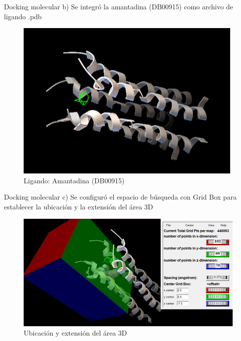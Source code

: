 \documentclass[11pt]{beamer}
\begin{document}
			\begin{frame}{Docking molecular}
			\justifying 
			b) Se integró la amantadina (DB00915) como archivo de ligando .pdb
			
			\begin{figure}[H]
				\centering
				\includegraphics[scale=0.5]{Eyligando.png}
				\caption{Ligando: Amantadina (DB00915)}
				\label{fig: Figura1}
			\end{figure}
		\end{frame} 
			
			
				\begin{frame}{Docking molecular}
			\justifying 
			c) Se configuró el espacio de búsqueda con Grid Box para establecer la ubicación y la extensión del área 3D
			
			\begin{figure}[H]
				\centering
				\includegraphics[scale=0.5]{grid.png}
				\caption{Ubicación y extensión del área 3D}
				\label{fig: Figura1}
			\end{figure}
		\end{frame} 
			
\end{document}
